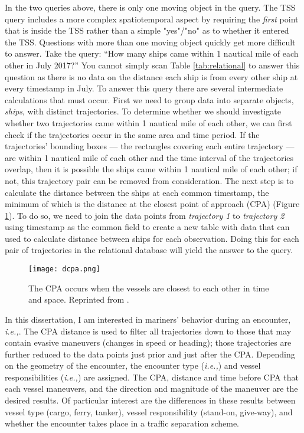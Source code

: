 \documentclass[twoside,symmetric,notoc]{tufte-book}
\newcommand{\hairsp}{\hspace{1pt}}
\newcommand{\ie}{\textit{i.\hairsp{}e.,}\hspace{3pt}}
\begin{document}
\par{%
In the two queries above, there is only one moving object in the query. The TSS query includes a more complex spatiotemporal aspect by requiring the \textit{first} point that is inside the TSS rather than a simple "yes"/"no" as to whether it entered the TSS. Questions with more than one moving object quickly get more difficult to answer. Take the query: ``How many ships came within 1 nautical mile of each other in July 2017?'' You cannot simply scan Table \ref{tab:relational} to answer this question as there is no data on the distance each ship is from every other ship at every timestamp in July. To answer this query there are several intermediate calculations that must occur. First we need to group data into separate objects, \textit{ships}, with distinct trajectories. To determine whether we should investigate whether two trajectories came within 1 nautical mile of each other, we can first check if the trajectories occur in the same area and time period. If the trajectories' bounding boxes --- the rectangles covering each entire trajectory --- are within 1 nautical mile of each other and the time interval of the trajectories overlap, then it is possible the ships came within 1 nautical mile of each other; if not, this trajectory pair can be removed from consideration. The next step is to calculate the distance between the ships at each common timestamp, the minimum of which is the distance at the closest point of approach (CPA) (Figure \ref{fig:dcpa}). To do so, we need to join the data points from \textit{trajectory 1} to \textit{trajectory 2} using timestamp as the common field to create a new table with data that can used to calculate distance between ships for each observation. Doing this for each pair of trajectories in the relational database will yield the answer to the query. 
\begin{figure}
\centering
	\texttt{[image: dcpa.png]}
	\caption[The CPA occurs when the vessels are closest to each other in time and space.]{The CPA occurs when the vessels are closest to each other in time and space. Reprinted from \citet{Arumugam}.}
	\label{fig:dcpa} 
\end{figure}
}
\par{%
In this dissertation, I am interested in mariners' behavior during an encounter, \ie{when another ship may influence their preferred route}. The CPA distance is used to filter all trajectories down to those that may contain evasive maneuvers (changes in speed or heading); those trajectories are further reduced to the data points just prior and just after the CPA. Depending on the geometry of the encounter, the encounter type (\ie{crossing, head-on, overtaking}) and vessel responsibilities (\ie{stand-on, give-way}) are assigned. The CPA, distance and time before CPA that each vessel maneuvers, and the direction and magnitude of the maneuver are the desired results. Of particular interest are the differences in these results between vessel type (cargo, ferry, tanker), vessel responsibility (stand-on, give-way), and whether the encounter takes place in a traffic separation scheme.
}
\end{document}
